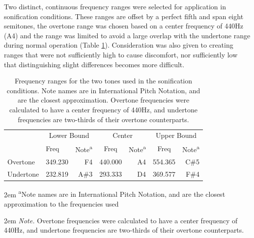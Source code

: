 \documentclass[10pt,a4paper,onecolumn]{article}
\begin{document}
Two distinct, continuous frequency ranges were selected for application in sonification conditions. These ranges are offset by a perfect fifth and span eight semitones, the overtone range was chosen based on a center frequency of 440Hz (A4) and the range was limited to avoid a large overlap with the undertone range during normal operation (Table \ref{tab:frequency-ranges}). Consideration was also given to creating ranges that were not sufficiently high to cause discomfort, nor sufficiently low that distinguishing slight differences becomes more difficult.

\begin{table}[!h]

\begin{threeparttable}
\caption{\label{tab:frequency-ranges}Frequency ranges for the two tones used in the sonification conditions. Note names are in International Pitch Notation, and are the closest approximation. Overtone frequencies were calculated to have a center frequency of 440Hz, and undertone frequencies are two-thirds of their overtone counterparts.}
\centering
\fontsize{7}{9}\selectfont
\begin{tabular}[t]{>{}l>{}l>{}r>{}c>{}r>{}c>{}r}
\toprule
\multicolumn{1}{c}{} & \multicolumn{2}{c}{Lower Bound} & \multicolumn{2}{c}{Center} & \multicolumn{2}{c}{Upper Bound} \\
\cmidrule(l{3pt}r{3pt}){2-3} \cmidrule(l{3pt}r{3pt}){4-5} \cmidrule(l{3pt}r{3pt}){6-7}
  & Freq & Note\textsuperscript{a} & Freq & Note\textsuperscript{a} & Freq & Note\textsuperscript{a}\\
\midrule
Overtone & 349.230 & F4 & 440.000 & A4 & 554.365 & C\#5\\
Undertone & 232.819 & A\#3 & 293.333 & D4 & 369.577 & F\#4\\
\bottomrule
\end{tabular}
\begin{tablenotes}
\small
\item [] 
\rightskip2em
{\footnotesize \sffamily \textsuperscript{a}Note names are in International Pitch Notation, and are the closest approximation to the frequencies used}
\item [] 
\rightskip2em
{\footnotesize \sffamily \textit{Note.} Overtone frequencies were calculated to have a center frequency of 440Hz, and undertone frequencies are two-thirds of their overtone counterparts.}
\end{tablenotes}
\end{threeparttable}
\end{table}
\end{document}
